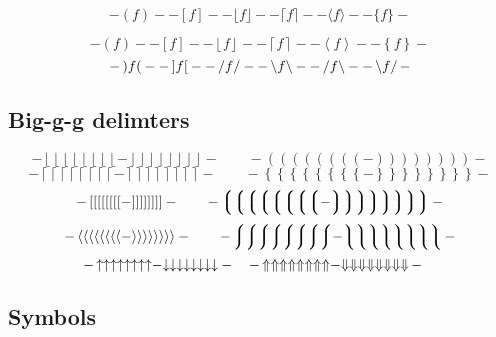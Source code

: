 \documentclass{article}
\begin{document}
\def\testdelim#1#2{ - #1 f #2 - }
\begin{displaymath}
  \testdelim() 
  \testdelim[] 
  \testdelim\lfloor\rfloor 
  \testdelim\lceil\rceil 
  \testdelim\langle\rangle 
  \testdelim\{\} 
\end{displaymath}

\def\testdelim#1#2{ - \left#1 f \right#2 - }
\begin{displaymath}
  \testdelim() 
  \testdelim[] 
  \testdelim\lfloor\rfloor 
  \testdelim\lceil\rceil 
  \testdelim\langle\rangle 
  \testdelim\{\} 
\end{displaymath}
\begin{displaymath}
  \testdelim)(
  \testdelim][
  \testdelim// 
  \testdelim\backslash\backslash
  \testdelim/\backslash 
  \testdelim\backslash/
\end{displaymath}


\clearpage
\subsection{Big-g-g delimters}

\def\testdelim#1#2{%
  - \left#1\left#1\left#1\left#1\left#1\left#1\left#1\left#1 - 
  \right#2\right#2\right#2\right#2\right#2\right#2\right#2\right#2 -}

\begingroup
\delimitershortfall-1pt
\begin{displaymath}
  \testdelim\lfloor\rfloor 
  \qquad 
  \testdelim()
\end{displaymath}
\begin{displaymath}
  \testdelim\lceil\rceil 
  \qquad 
  \testdelim\{\} 
\end{displaymath}
\begin{displaymath}
  \testdelim[] 
  \qquad 
  \testdelim\lgroup\rgroup
\end{displaymath}
\begin{displaymath}
  \testdelim\langle\rangle
  \qquad 
  \testdelim\lmoustache\rmoustache
\end{displaymath}
\begin{displaymath}
  \testdelim\uparrow\downarrow \quad
  \testdelim\Uparrow\Downarrow \quad
\end{displaymath}
\endgroup %

\subsection{Symbols}
\label{sec:symbols}
\end{document}
